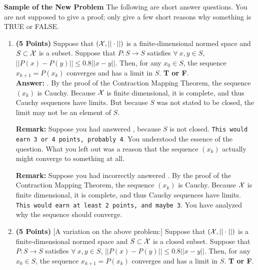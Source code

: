 \documentclass[letterpaper]{article}
\begin{document}
\vspace*{2cm}

\textbf{\large Sample of the New Problem} The following are short answer questions. You are not supposed to give a proof; only give a few short reasons why something is TRUE or FALSE.

\begin{enumerate}
\setlength{\itemsep}{.15in}
\renewcommand{\labelenumi}{(\alph{enumi})}
\setlength{\itemsep}{.1in}

\item \textbf{(5 Points)} Suppose that $({\cal X}, || \cdot||)$ is a finite-dimensional normed space and $S \subset {\cal X}$ is a subset. Suppose that $P:S \to S$ satisfies $\forall~ x,y \in S$, $||P(x)-P(y)|| \le 0.8 ||x-y||$.  Then, for any $x_0 \in S$, the sequence $x_{k+1}=P(x_k)$ converges and has a limit in $S$. \textbf{ T or F}.\\

    \textbf{Answer:} . By the proof of the Contraction Mapping Theorem, the sequence $(x_k)$ is Cauchy. Because ${\cal X}$ is finite dimensional, it is complete, and thus Cauchy sequences have limits. But because $S$ was not stated to be closed, the limit may not be an element of $S$.
    
     \vspace*{0.4cm}  
     \textbf{Remark:} Suppose you had answered , because $S$ is not closed. \texttt{This would earn 3 or 4 points, probably 4}. You understood the essence of the question. What you left out was a reason that the sequence $(x_k)$ actually might converge to something at all.
     
          \vspace*{0.4cm}
     \textbf{Remark:} Suppose you had incorrectly answered .  By the proof of the Contraction Mapping Theorem, the sequence $(x_k)$ is Cauchy. Because ${\cal X}$ is finite dimensional, it is complete, and thus Cauchy sequences have limits. \texttt{This would earn at least 2 points, and maybe 3}. You have analyzed why the sequence should converge.

    \item \textbf{(5 Points)} [A variation on the above problem:] Suppose that $({\cal X}, || \cdot||)$ is a finite-dimensional normed space and $S \subset {\cal X}$ is a closed subset. Suppose that $P:S \to S$ satisfies $\forall~ x,y \in S$, $||P(x)-P(y)|| \le 0.8 ||x-y||$.  Then, for any $x_0 \in S$, the sequence $x_{k+1}=P(x_k)$ converges and has a limit in $S$. \textbf{ T or F}.\\


\end{enumerate}
\end{document}
